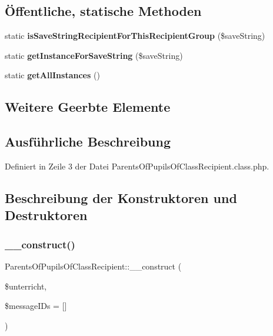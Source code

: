 \subsection*{Öffentliche, statische Methoden}
\begin{DoxyCompactItemize}
\item 
\mbox{\label{class_parents_of_pupils_of_class_recipient_a4a52a0ac97df85502386d3da36d00ff8}} 
static {\bfseries is\+Save\+String\+Recipient\+For\+This\+Recipient\+Group} (\$save\+String)
\item 
\mbox{\label{class_parents_of_pupils_of_class_recipient_a02cb2929fb9090834b37cbde16e6d4e2}} 
static {\bfseries get\+Instance\+For\+Save\+String} (\$save\+String)
\item 
\mbox{\label{class_parents_of_pupils_of_class_recipient_a941628bd359e9850e1d19458c4f1331f}} 
static {\bfseries get\+All\+Instances} ()
\end{DoxyCompactItemize}
\subsection*{Weitere Geerbte Elemente}


\subsection{Ausführliche Beschreibung}


Definiert in Zeile 3 der Datei Parents\+Of\+Pupils\+Of\+Class\+Recipient.\+class.\+php.



\subsection{Beschreibung der Konstruktoren und Destruktoren}
\mbox{\label{class_parents_of_pupils_of_class_recipient_a80a6d00c4d6e6c2678ff618a5e5cd6af}} 
\subsubsection{\texorpdfstring{\+\_\+\+\_\+construct()}{\_\_construct()}}
{\footnotesize\ttfamily Parents\+Of\+Pupils\+Of\+Class\+Recipient\+::\+\_\+\+\_\+construct (\begin{DoxyParamCaption}\item[{}]{\$unterricht,  }\item[{}]{\$message\+I\+Ds = {\ttfamily \mbox{[}\mbox{]}} }\end{DoxyParamCaption})}


